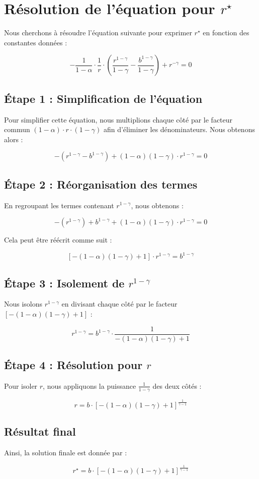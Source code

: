 \documentclass[a4paper, 12pt]{report}
\begin{document}
\section*{Résolution de l'équation pour $r^\star$}

Nous cherchons à résoudre l'équation suivante pour exprimer $r^\star$ en fonction des constantes données :

\[
-\frac{1}{1-\alpha} \cdot \frac{1}{r} \cdot \left( \frac{r^{1-\gamma}}{1-\gamma} - \frac{b^{1-\gamma}}{1-\gamma} \right) + r^{-\gamma} = 0
\]

\subsection*{Étape 1 : Simplification de l'équation}

Pour simplifier cette équation, nous multiplions chaque côté par le facteur commun $(1-\alpha) \cdot r \cdot (1-\gamma)$ afin d'éliminer les dénominateurs. Nous obtenons alors :

\[
-\left( r^{1-\gamma} - b^{1-\gamma} \right) + (1-\alpha)(1-\gamma) \cdot r^{1-\gamma} = 0
\]

\subsection*{Étape 2 : Réorganisation des termes}

En regroupant les termes contenant $r^{1-\gamma}$, nous obtenons :

\[
-\left( r^{1-\gamma} \right) + b^{1-\gamma} + (1-\alpha)(1-\gamma) \cdot r^{1-\gamma} = 0
\]

Cela peut être réécrit comme suit :

\[
\left[ -(1-\alpha)(1-\gamma) + 1 \right] \cdot r^{1-\gamma} = b^{1-\gamma}
\]

\subsection*{Étape 3 : Isolement de $r^{1-\gamma}$}

Nous isolons $r^{1-\gamma}$ en divisant chaque côté par le facteur $\left[ -(1-\alpha)(1-\gamma) + 1 \right]$ :

\[
r^{1-\gamma} = b^{1-\gamma} \cdot \frac{1}{-(1-\alpha)(1-\gamma) + 1}
\]

\subsection*{Étape 4 : Résolution pour $r$}

Pour isoler $r$, nous appliquons la puissance $\frac{1}{1-\gamma}$ des deux côtés :

\[
r = b \cdot \left[ -(1-\alpha)(1-\gamma) + 1 \right]^{\frac{1}{\gamma-1}}
\]

\subsection*{Résultat final}

Ainsi, la solution finale est donnée par :

\[
r^\star = b \cdot \left[ -(1-\alpha)(1-\gamma) + 1 \right]^{\frac{1}{\gamma-1}}
\]
\end{document}
